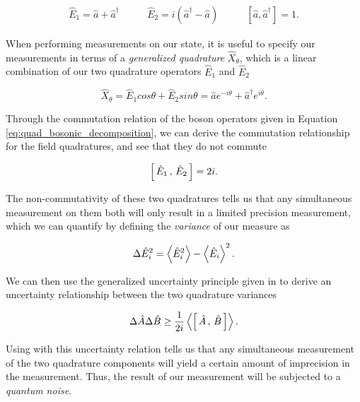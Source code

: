 \begin{eqnarray}
  \label{eq:quad_bosonic_decomposition}
  \hat{E}_{1} = \hat{a} + \hat{a}^{\dagger }  \quad  & \quad    \hat{E}_{2} =
i (\hat{a}^{\dagger } - \hat{a})   \quad  & \quad    [\hat{a},
\hat{a}^{\dagger }] = 1.
\end{eqnarray}

\noindent
When performing measurements on our state, it is useful to specify our measurements in terms of a \emph{generalized quadrature} $\hat{X}_\theta $, which is a linear combination of our two quadrature operators $\hat{E}_{1}$ and $\hat{E}_{2}$ \cite{Fabre90}

\begin{equation}
  \label{eq:generalized_quadratures}
  \hat{X}_\theta = \hat{E}_1 cos \theta + \hat{E}_2 sin \theta = \hat{a} e^{-i
\theta } + \hat{a}^{\dagger} e^{i \theta}.
\end{equation}

\noindent
Through the commutation relation of the boson operators given in Equation \ref{eq:quad_bosonic_decomposition}, we can derive the commutation relationship for the field quadratures, and see that they do not commute

\begin{equation}
  \label{eq:quadrature_commutation}
  \mbox{$\displaystyle\left[\,\hat{E}_1\,,\,\hat{E}_2\,\right]$}=2i.
\end{equation}

\noindent
The non-commutativity of these two quadratures tells us that any simultaneous measurement on them both will only result in a limited precision measurement, which we can quantify by defining the \emph{variance} of our measure as

\begin{equation}
  \label{eq:variance_definition}
  \Delta \hat{E}_i^2 = \left< \hat{E}^2_i \right> - \left< \hat{E}_i \right>^2.
\end{equation}

\noindent
We can then use the generalized uncertainty principle given in
 to derive an uncertainty relationship between the two quadrature variances

\begin{equation}
  \label{eq:HUP}
  \Delta \hat{A} \Delta \hat{B} \ge \frac{1}{2i} \left< \mbox{$\displaystyle\left[\,\hat{A}\,,\,\hat{B}\,\right]$} \right>.
\end{equation}

\noindent
Using  with this uncertainty relation tells us
that any simultaneous measurement of the two quadrature components will yield a
certain amount of imprecision in the measurement.  Thus, the result of our measurement will be subjected to a \emph{quantum noise}.

